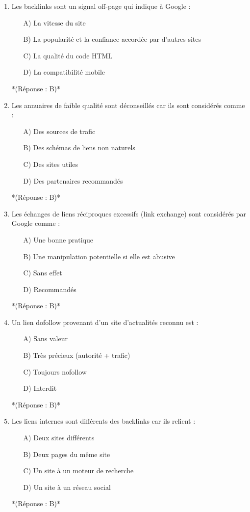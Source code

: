 \documentclass[12pt,a4paper,twoside]{report}
\begin{document}
\begin{enumerate}
\item Les backlinks sont un signal off-page qui indique à Google :
\begin{itemize}
\item[A)] La vitesse du site
\item[B)] La popularité et la confiance accordée par d'autres sites
\item[C)] La qualité du code HTML
\item[D)] La compatibilité mobile
\end{itemize}
*(Réponse : B)*

\item Les annuaires de faible qualité sont déconseillés car ils sont considérés comme :
\begin{itemize}
\item[A)] Des sources de trafic
\item[B)] Des schémas de liens non naturels
\item[C)] Des sites utiles
\item[D)] Des partenaires recommandés
\end{itemize}
*(Réponse : B)*

\item Les échanges de liens réciproques excessifs (link exchange) sont considérés par Google comme :
\begin{itemize}
\item[A)] Une bonne pratique
\item[B)] Une manipulation potentielle si elle est abusive
\item[C)] Sans effet
\item[D)] Recommandés
\end{itemize}
*(Réponse : B)*

\item Un lien dofollow provenant d'un site d'actualités reconnu est :
\begin{itemize}
\item[A)] Sans valeur
\item[B)] Très précieux (autorité + trafic)
\item[C)] Toujours nofollow
\item[D)] Interdit
\end{itemize}
*(Réponse : B)*

\item Les liens internes sont différents des backlinks car ils relient :
\begin{itemize}
\item[A)] Deux sites différents
\item[B)] Deux pages du même site
\item[C)] Un site à un moteur de recherche
\item[D)] Un site à un réseau social
\end{itemize}
*(Réponse : B)*


\end{enumerate}
\end{document}
